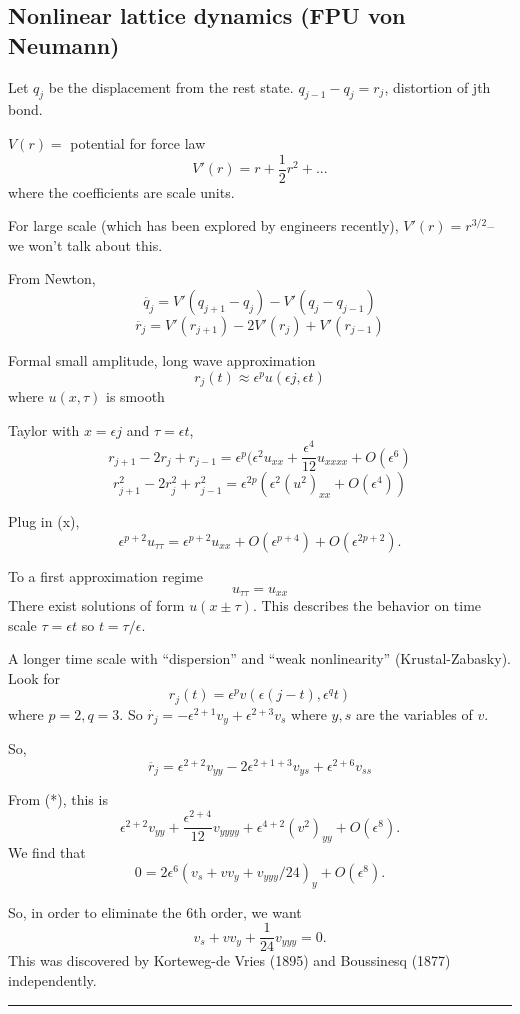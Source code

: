 \documentclass[11pt]{amsart}%
\begin{document}
\subsection*{Nonlinear lattice dynamics (FPU von Neumann)}

Let $q_{j}$ be the displacement from the rest state. $q_{j-1}-q_j = r_j$, distortion of jth bond.

$V(r)=$ potential for force law
$$V'(r) = r + \frac{1}{2} r^2 + ...$$ where the coefficients are scale units.

For large scale (which has been explored by engineers recently), $V'(r) = r^{3/2}$-- we won't talk about this.

From Newton,
$$\ddot{q_j}= V'(q_{j+1}-q_j) - V'(q_j-q_{j-1})$$
\[ \ddot{r_j} = V'(r_{j+1}) - 2V'(r_j) + V'(r_{j-1}) \tag{*} \]

Formal small amplitude, long wave approximation
$$r_j(t) \approx \epsilon^p u(\epsilon j, \epsilon t)$$ where $u(x,\tau)$ is smooth

Taylor with $x=\epsilon j$ and $\tau=\epsilon t$,
$$r_{j+1}-2r_j + r_{j-1} = \epsilon^p(\epsilon^2 u_{xx} +\frac{\epsilon^4}{12}u_{xxxx} + O(\epsilon^6)$$
$$r_{j+1}^2 - 2r_j^2 + r_{j-1}^2 = \epsilon^{2p}(\epsilon^2(u^2)_{xx} + O(\epsilon^4))$$

Plug in (x),
$$\epsilon^{p+2}u_{\tau\tau} = \epsilon^{p+2}u_{xx} + O(\epsilon^{p+4}) + O(\epsilon^{2p+2}).$$

To a first approximation regime
$$u_{\tau\tau}=u_{xx}$$
There exist solutions of form $u(x\pm \tau)$. This describes the behavior on time scale $\tau= \epsilon t$ so $t=\tau/\epsilon$.

A longer time scale with ``dispersion'' and ``weak nonlinearity'' (Krustal-Zabasky). Look for
$$r_j(t) = \epsilon^{p}v(\epsilon(j-t), \epsilon^q t)$$ where $p=2, q=3$. So
$\dot{r_j} = -\epsilon^{2+1}v_y + \epsilon^{2+3}v_s$ where $y,s$ are the variables of $v$.

So,
$$\ddot{r_j} = \epsilon^{2+2} v_{yy} - 2\epsilon^{2+1+3} v_{ys} + \epsilon^{2+6}v_{ss}$$

From (*), this is
$$\epsilon^{2+2}v_{yy} +\frac{\epsilon^{2+4}}{12}v_{yyyy} + \epsilon^{4+2}(v^2)_{yy} + O(\epsilon^8).$$
We find that
$$0=2\epsilon^{6}(v_s+vv_y + v_{yyy}/24)_y + O(\epsilon^8).$$

So, in order to eliminate the 6th order, we want
$$v_s+vv_y+\frac{1}{24} v_{yyy}=0.$$ This was discovered by Korteweg-de Vries (1895) and Boussinesq (1877) independently.

\begin{center}\rule{0.5\linewidth}{\linethickness}\end{center}
\end{document}

